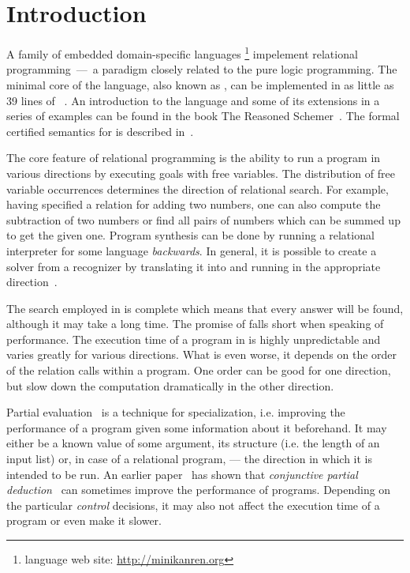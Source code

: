 \section{Introduction}

A family of embedded domain-specific languages \mk\footnote{\mk language web site: \url{http://minikanren.org}} impelement relational programming~---~a paradigm closely related to the pure logic programming.
The minimal core of the language, also known as \muk, can be implemented in as little as 39 lines of \scheme~\cite{friedmanmukanren}.
An introduction to the language and some of its extensions in a series of examples can be found in the book The Reasoned Schemer~\cite{TheReasonedSchemer}.
The formal certified semantics for \mk is described in~\cite{rozplokhas2020certified}.

The core feature of relational programming is the ability to run a program in various directions by executing goals with free variables.
The distribution of free variable occurrences determines the direction of relational search.
For example, having specified a relation for adding two numbers, one can also compute the subtraction of two numbers or find all pairs of numbers which can be summed up to get the given one.
Program synthesis can be done by running a relational interpreter for some language \emph{backwards}.
In general, it is possible to create a solver from a recognizer by translating it into \mk and running in the appropriate direction~\cite{lozov2019relational}.

The search employed in \mk is complete which means that every answer will be found, although it may take a long time.
The promise of \mk falls short when speaking of performance.
The execution time of a program in \mk is highly unpredictable and varies greatly for various directions.
What is even worse, it depends on the order of the relation calls within a program.
One order can be good for one direction, but slow down the computation dramatically in the other direction.

Partial evaluation~\cite{jonesbook} is a technique for specialization, i.e. improving the performance of a program given some information about it beforehand.
It may either be a known value of some argument, its structure (i.e. the length of an input list) or, in case of a relational program, --- the direction in which it is intended to be run.
An earlier paper~\cite{lozov2019relational} has shown that \emph{conjunctive partial deduction}~\cite{de1999conjunctive} can sometimes improve the performance of \mk programs.
Depending on the particular \emph{control} decisions, it may also not affect the execution time of a program or even make it slower.

